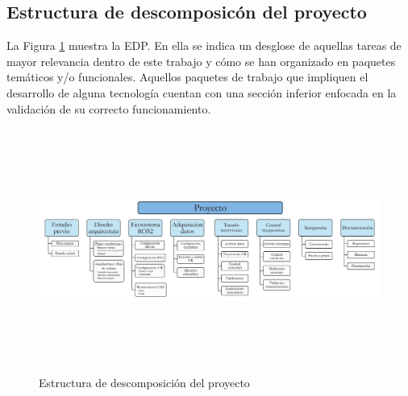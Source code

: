 \begin{landscape}
    \subsection{Estructura de descomposicón del proyecto}
    La Figura \ref{fig:edp_completa} muestra la \acrfull{EDP}. En ella se indica un desglose de aquellas tareas de mayor relevancia dentro de este trabajo y cómo se han organizado en paquetes temáticos y/o funcionales. Aquellos paquetes de trabajo que impliquen el desarrollo de alguna tecnología cuentan con una sección inferior enfocada en la validación de su correcto funcionamiento.
        \begin{figure}[h!]
            \centering
            \includegraphics[width=\linewidth, height=8cm]{figuras/edp_completa_horizontal.jpg}
            \caption{Estructura de descomposición del proyecto}
            \label{fig:edp_completa}
        \end{figure}
\end{landscape}
\restoregeometry

